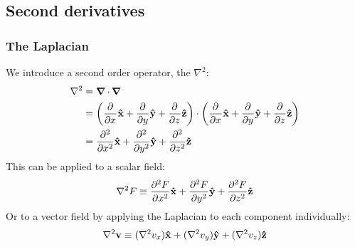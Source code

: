 \subsection{Second derivatives}
\subsubsection{The Laplacian}
We introduce a second order operator, the  $\nabla^2$:
\begin{align*}
\nabla^2 &= \vnabla \cdot \vnabla \\
&= \left(\pd{}{x}\vhat{x} + \pd{}{y}\vhat{y} + \pd{}{z}\vhat{z}\right)\cdot \left(\pd{}{x}\vhat{x} + \pd{}{y}\vhat{y} + \pd{}{z}\vhat{z}\right) \\
&= \pd[2]{}{x}\vhat{x} + \pd[2]{}{y}\vhat{y} + \pd[2]{}{z}\vhat{z}
\end{align*}
This can be applied to a scalar field:
\[ \nabla^2 F \equiv \pd[2]{F}{x}\vhat{x} + \pd[2]{F}{y}\vhat{y} + \pd[2]{F}{z}\vhat{z} \]
Or to a vector field by applying the Laplacian to each component individually:
\[ \nabla^2 \vec{v} \equiv (\nabla^2 v_x)\vhat{x} + (\nabla^2 v_y)\vhat{y} + (\nabla^2 v_z)\vhat{z} \]
